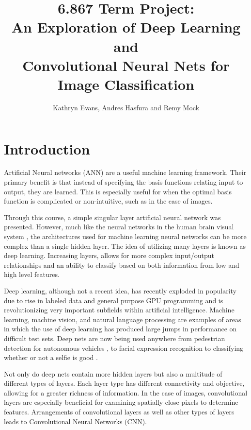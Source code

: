 \documentclass[12pt, twocolumn]{article}
\begin{document}
\title{ 6.867 Term Project: \\ An Exploration of Deep Learning and \\ Convolutional Neural Nets for Image Classification\\ }
 \author{Kathryn Evans, Andres Hasfura and Remy Mock}
\maketitle

\section{ Introduction} 
Artificial Neural networks (ANN) are a useful machine learning framework. Their primary benefit is that instead of specifying the basis functions relating input to output, they are learned.  This is especially useful for when the optimal basis function is complicated or non-intuitive, such as in the case of images.


Through this course, a simple singular layer artificial neural network was presented. However, much like the neural networks in the human brain visual system , the architectures used for machine learning neural networks can be more complex than a single hidden layer. The idea of utilizing many layers is known as deep learning.  Increasing layers, allows for more complex input/output relationships and an ability to classify based on both information from low and high level features.

Deep learning, although not a recent idea, has recently exploded in popularity due to rise in labeled data and general purpose GPU programming and is revolutionizing very important subfields within artificial intelligence. Machine learning, machine vision, and natural language processing are examples of areas in which the use of deep learning has produced large jumps in performance on difficult test sets. Deep nets are now being used anywhere from pedestrian detection for autonomous vehicles \cite{Szarvas2006}, to facial expression recognition \cite{Li2015} to classifying whether or not a selfie is good \cite{Karpathy}. 
	
Not only do deep nets contain more hidden layers but also a multitude of different types of layers. Each layer type has different connectivity and objective, allowing for a greater richness of information. In the case of images, convolutional layers are especially beneficial for examining spatially close pixels to determine features. Arrangements of convolutional layers as well as other types of layers leads to Convolutional Neural Networks (CNN). 
\end{document}
